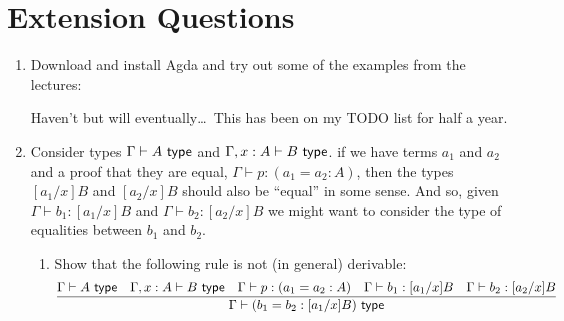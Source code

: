 \documentclass[10pt,\jkfside,a4paper]{article}
\begin{document}
\section{Extension Questions}

\begin{enumerate}

    \item Download and install Agda and try out some of the examples from the lectures:

    Haven't but will eventually\ldots\ This has been on my TODO list for half a year.


    \item Consider types $\Gamma \vdash A\ \type$ and $\Gamma, x: A \vdash B\ \type$. if we have terms $a_1$ and $a_2$ and a proof that they are equal, $\Gamma \vdash p: (a_1 = a_2: A)$, then the types $[a_1/x]B$ and $[a_2/x]B$ should also be ``equal'' in some sense. And so, given $\Gamma \vdash b_1: [a_1/x]B$ and $\Gamma \vdash b_2: [a_2/x]B$ we might want to consider the type of equalities between $b_1$ and $b_2$.

    \begin{enumerate}

        \item Show that the following rule is not (in general) derivable:
        \[
            \frac{
                \Gamma \vdash A\ \mathsf{type}
                \quad
                \Gamma, x: A \vdash B\ \mathsf{type}
                \quad
                \Gamma \vdash p: (a_1 = a_2: A)
                \quad
                \Gamma \vdash b_1: [a_1/x]B
                \quad
                \Gamma \vdash b_2: [a_2/x]B
            }{
                \Gamma \vdash (b_1 = b_2 : [a_1/x]B)\ \mathsf{type}
            }
        \]


\end{enumerate}
\end{enumerate}
\end{document}
